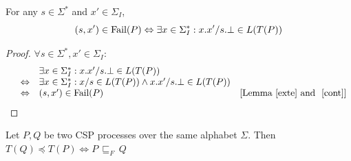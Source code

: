 \begin{lemma}\label{conf}
For any $s\in \Sigma^*$ and $x'\in \Sigma_I$,
$$(s,   x')\in {\text {\rm Fail}}(P)\Leftrightarrow \exists x\in \Sigma_I^*: x.x'/s.\bot \in L(T(P))$$
\end{lemma}
\begin{proof}
$\forall s\in \Sigma^*, x'\in \Sigma_I$:
\[\begin{array}{llll}
&& \exists x\in \Sigma_I^*: x.x'/s.\bot\in L(T(P))&\\
&\Leftrightarrow & \exists x\in \Sigma_I^*: x/s\in L(T(P))\wedge x.x'/s.\bot\in L(T(P))&\\
&\Leftrightarrow & (s,   x')\in {\text {\rm Fail}}(P)&[{\text {Lemma~\ref{exte} and ~\ref{cont}}}]

\end{array}
\]
\end{proof}
\begin{theorem}
Let $P,Q$ be two CSP processes over the same alphabet $\Sigma$. Then\\
$T(Q)\preceq T(P) \Leftrightarrow P\,\sqsubseteq_F\, Q$
\end{theorem}
